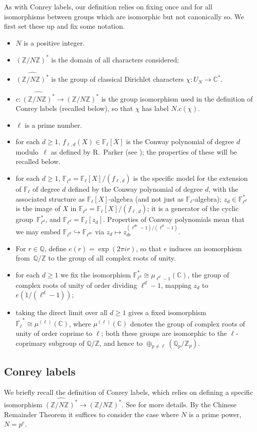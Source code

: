 \documentclass[a4paper, 10pt]{amsart}
\def\Z{{\mathbb Z}}
\def\Q{{\mathbb Q}}
\def\C{{\mathbb C}}
\def\F{{\mathbb F}}
\def\Fl{{\mathbb F}_{\ell}}
\def\Fld{{\mathbb F}_{\ell^d}}
\def\Flbar{\overline{{\mathbb F}_{\ell}}}
\def\ZNs{(\Z/N\Z)^*}
\def\ZNsh{\widehat{\ZNs}}
\newcommand{\CLab}[2]{$#1.#2$}
\begin{document}
As with Conrey labels, our definition relies on fixing once and for
all isomorphisms between groups which are isomorphic but not
canonically so.  We first set these up and fix some notation.

\begin{itemize}
\item $N$ is a positive integer.
\item $\ZNs$ is the domain of all characters considered;
\item $\ZNsh$ is the group of classical Dirichlet characters
  $\chi:U_N\to\C^*$.
\item $c:\ZNsh\to\ZNs$ is the group isomorphism used in the
  definition of Conrey labels (recalled below), so that $\chi$ has
  label \CLab{N}{c(\chi)}.
\item $\ell$ is a prime number.
\item for each $d\ge1$, $f_{\ell,d}(X) \in \Fl[X]$ is the Conway
  polynomial of degree $d$ modulo~$\ell$ as defined by R.~Parker (see
  \cite{ConwayPol}); the properties of these will be recalled below.
\item for each $d\ge1$, $\Fld=\Fl[X]/(f_{\ell,d})$ is the specific
  model for the extension of $\Fl$ of degree $d$ defined by the Conway
  polynomial of degree $d$, with the associated structure as
  $\Fl[X]$-algebra (and not just as $\Fl$-algebra); $z_d\in\Fld^*$ is
  the image of $X$ in $\Fld=\Fl[X]/(f_{\ell,d})$; it is a generator of
  the cyclic group~$\Fld^*$, and $\Fld=\Fl[z_d]$.  Properties of
  Conway polynomials mean that we may embed
  $\Fld\hookrightarrow\F_{\ell^{de}}$ via $z_d\mapsto
  z_{de}^{(\ell^{de}-1)/(\ell^d-1)}$.
\item For $r\in\Q$, define $e(r)=\exp(2\pi ir)$, so that $e$ induces an
  isomorphism from~$\Q/\Z$ to the group of all complex roots of unity.
\item for each $d\ge1$ we fix the isomorphism
  $\Fld^*\cong\mu_{\ell^d-1}(\C)$, the group of complex roots of unity
  of order dividing $\ell^d-1$, mapping $z_d$ to $e(1/(\ell^d-1))$;
\item taking the direct limit over all $d\ge1$ gives a fixed
  isomorphism $\Flbar^*\cong\mu^{(\ell)}(\C)$, where
  $\mu^{(\ell)}(\C)$ denotes the group of complex roots of unity of
  order coprime to $\ell$; both these groups are isomorphic to the
  $\ell$-coprimary subgroup of $\Q/\Z$, and hence to
  $\oplus_{p\not=\ell}(\Q_p/\Z_p)$.
\end{itemize}

\subsection{Conrey labels}
We briefly recall the definition of Conrey labels, which relies on
defining a specific isomorphism $\ZNsh\to\ZNs$.  See
\cite{ConreyLabels} for more details. By the Chinese Remainder Theorem
it suffices to consider the case where $N$ is a prime power, $N=p^e$.
\end{document}
